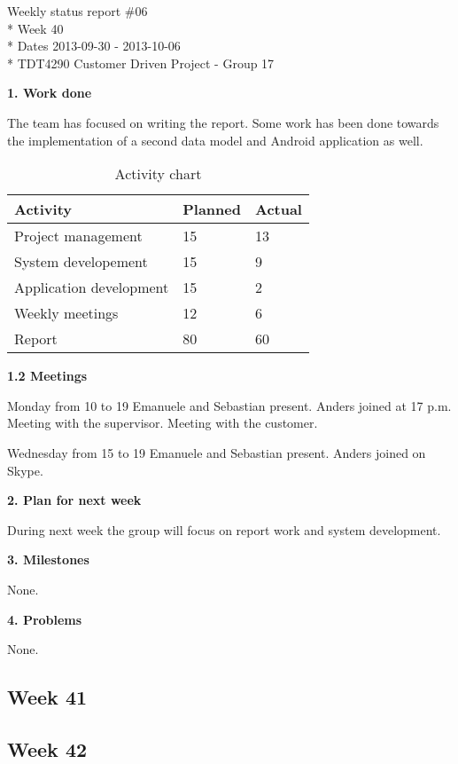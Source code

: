 \begin{center}
Weekly status report \#06\\*
Week 40 \\*
Dates 2013-09-30 - 2013-10-06 \\*
TDT4290 Customer Driven Project - Group 17
\end{center}

\textbf{1. Work done}

The team has focused on writing the report. Some work has been done towards
the implementation of a second data model and Android application as well.

\begin{table}[H]
\begin{center}
\begin{tabular}{ l | l | l }
  \hline
  Activity & Planned & Actual \\
  \hline\noalign{\smallskip}\noalign{\smallskip}\hline
  Project management & 15 & 13 \\
  System developement & 15 & 9 \\
  Application development & 15 & 2 \\
  Weekly meetings & 12 & 6 \\
  Report & 80 & 60 \\
  \hline
\end{tabular}
\end{center}
\caption{Activity chart}
\label{table:activityChartStatusReportWeek40}
\end{table}

\textbf{1.2 Meetings}

Monday from 10 to 19
Emanuele and Sebastian present. Anders joined at 17 p.m.
Meeting with the supervisor. Meeting with the customer.

Wednesday from 15 to 19
Emanuele and Sebastian present. Anders joined on Skype.

\textbf{2. Plan for next week}

During next week the group will focus on report work and system development.

\textbf{3. Milestones}

None.

\textbf{4. Problems}

None.


\subsection{Week 41}

\subsection{Week 42}

